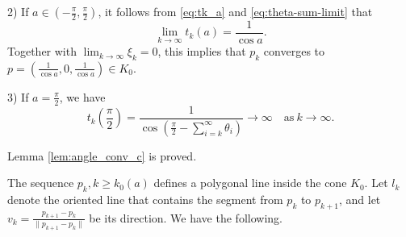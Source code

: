 \documentclass[12pt]{article}
\begin{document}
2) 
If $a \in \left(-\frac{\pi}{2}, \frac{\pi}{2}\right)$, it follows from \eqref{eq:tk_a} and \eqref{eq:theta-sum-limit} that
$$
\lim_{k \to \infty} t_k(a) = \frac{1}{\cos a}.
$$
Together with $\lim_{k\to\infty}\xi_k = 0$, this implies that $p_k$ converges to 
$p=(\frac{1}{\cos a}, 0, \frac{1}{\cos a})\in K_0$.

3)
If $a = \frac{\pi}{2}$, we have
$$
t_k\left(\frac{\pi}{2}\right) = \frac{1}{\cos\left(\frac{\pi}{2} - \sum_{i=k}^\infty \theta_i\right)} \to \infty 
\quad \text{as}\ k \to \infty.
$$

Lemma \ref{lem:angle_conv_c} is proved.

\vspace*{1em}

The sequence $p_k, k\geq k_0(a)$ defines a polygonal line inside the cone $K_0$. Let $l_k$ denote the oriented line that contains the segment from $p_k$ to $p_{k+1}$, 
and let $v_{k} = \frac{p_{k+1}-p_{k}}{\|p_{k+1}-p_{k}\|}$ be its direction.
We have the following.
\end{document}
